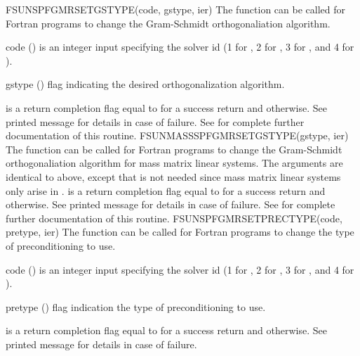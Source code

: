 {
  FSUNSPFGMRSETGSTYPE(code, gstype, ier)
}
{
  The function  can be called for Fortran
  programs to change the Gram-Schmidt orthogonaliation algorithm.
}
{
  \begin{args}[gstype]
  \item[code] ()
    is an integer input specifying the solver id (1 for {\cvode}, 2
    for {\ida}, 3 for {\kinsol}, and 4 for {\arkode}).
  \item[gstype] ()
    flag indicating the desired orthogonalization algorithm.
  \end{args}
}
{
   is a  return completion flag equal to  for a success
  return and  otherwise. See printed message for details in case
  of failure.
}
{
  See  for complete further documentation of
  this routine.
}
{
  FSUNMASSSPFGMRSETGSTYPE(gstype, ier)
}
{
  The function  can be called for Fortran
  programs to change the Gram-Schmidt orthogonaliation algorithm for
  mass matrix linear systems.
}
{
  The arguments are identical to  above, except that
   is not needed since mass matrix linear systems only arise
  in {\arkode}.
}
{
   is a  return completion flag equal to  for a success
  return and  otherwise. See printed message for details in case
  of failure.
}
{
  See  for complete further documentation of
  this routine.
}
{
  FSUNSPFGMRSETPRECTYPE(code, pretype, ier)
}
{
  The function  can be called for Fortran
  programs to change the type of preconditioning to use.
}
{
  \begin{args}[pretype]
  \item[code] ()
    is an integer input specifying the solver id (1 for {\cvode}, 2
    for {\ida}, 3 for {\kinsol}, and 4 for {\arkode}).
  \item[pretype] ()
    flag indication the type of preconditioning to use.
  \end{args}
}
{
   is a  return completion flag equal to  for a success
  return and  otherwise. See printed message for details in case
  of failure.
}
